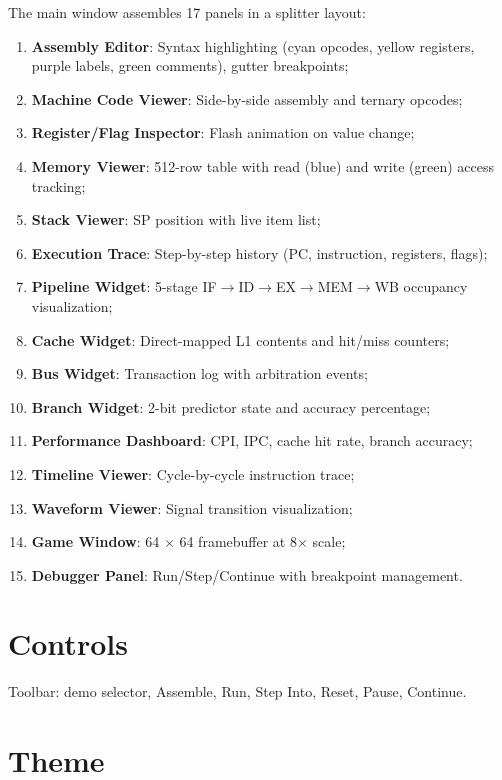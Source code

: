 \documentclass[10pt,a4paper,twoside]{book}
\begin{document}
The main window assembles 17 panels in a splitter layout:
\begin{enumerate}
    \item \textbf{Assembly Editor}: Syntax highlighting (cyan opcodes, yellow registers,
          purple labels, green comments), gutter breakpoints;
    \item \textbf{Machine Code Viewer}: Side-by-side assembly and ternary opcodes;
    \item \textbf{Register/Flag Inspector}: Flash animation on value change;
    \item \textbf{Memory Viewer}: 512-row table with read (blue) and write (green)
          access tracking;
    \item \textbf{Stack Viewer}: SP position with live item list;
    \item \textbf{Execution Trace}: Step-by-step history (PC, instruction, registers,
          flags);
    \item \textbf{Pipeline Widget}: 5-stage IF$\rightarrow$ID$\rightarrow$EX$\rightarrow$MEM$\rightarrow$WB
          occupancy visualization;
    \item \textbf{Cache Widget}: Direct-mapped L1 contents and hit/miss counters;
    \item \textbf{Bus Widget}: Transaction log with arbitration events;
    \item \textbf{Branch Widget}: 2-bit predictor state and accuracy percentage;
    \item \textbf{Performance Dashboard}: CPI, IPC, cache hit rate, branch accuracy;
    \item \textbf{Timeline Viewer}: Cycle-by-cycle instruction trace;
    \item \textbf{Waveform Viewer}: Signal transition visualization;
    \item \textbf{Game Window}: 64 $\times$ 64 framebuffer at 8$\times$ scale;
    \item \textbf{Debugger Panel}: Run/Step/Continue with breakpoint management.
\end{enumerate}

\section{Controls}

Toolbar: demo selector, Assemble, Run, Step Into, Reset, Pause, Continue.

\section{Theme}
\end{document}
